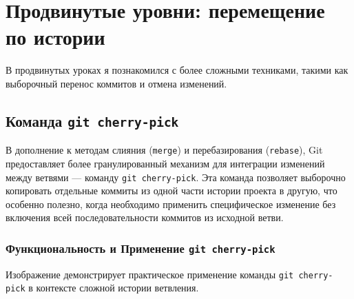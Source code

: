 \section{Продвинутые уровни: перемещение по истории}\label{sec:lgb-advanced-history-navigation}
В продвинутых уроках я познакомился с более сложными техниками, такими как выборочный перенос коммитов и отмена изменений.

\subsection{Команда \texttt{git cherry-pick}}\label{subsec:lgb-cherry-pick}
В дополнение к методам слияния (\texttt{merge}) и перебазирования (\texttt{rebase}), Git предоставляет более гранулированный механизм для интеграции изменений между ветвями — команду \texttt{git cherry-pick}.
Эта команда позволяет выборочно копировать отдельные коммиты из одной части истории проекта в другую, что особенно полезно, когда необходимо применить специфическое изменение без включения всей последовательности коммитов из исходной ветви.

\subsubsection{Функциональность и Применение \texttt{git cherry-pick}}\label{subsubsec:cherry-pick-functionality}
Изображение  демонстрирует практическое применение команды \texttt{git cherry-pick} в контексте сложной истории ветвления.

\label{fig:lgb_cherry_pick}

